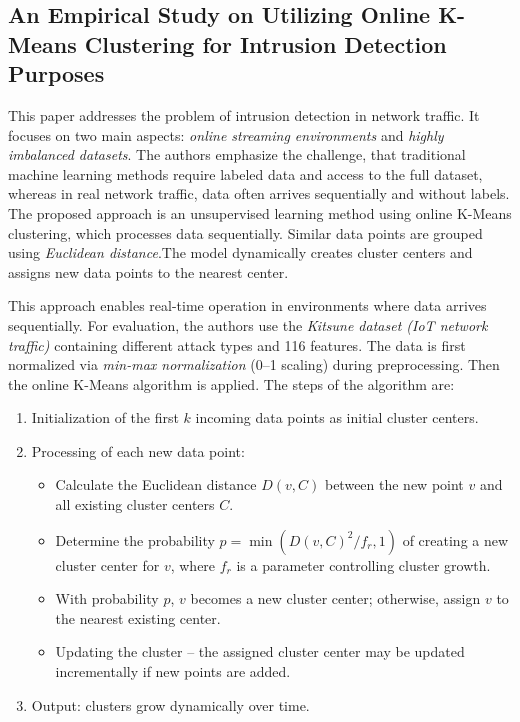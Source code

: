 \subsection{An Empirical Study on Utilizing Online K-Means Clustering for Intrusion Detection Purposes}
This paper \cite{younisse2023empirical} addresses the problem of intrusion detection in network traffic. It focuses on two main aspects: \emph{online streaming environments} and \emph{highly imbalanced datasets}.
The authors emphasize the challenge, that traditional machine learning methods require labeled data and access to the full dataset, whereas in real network traffic, data often arrives sequentially and without labels.
The proposed approach is an unsupervised learning method using online K-Means clustering, which processes data sequentially.
Similar data points are grouped using \emph{Euclidean distance}.The model dynamically creates cluster centers and assigns new data points to the nearest center.

\nextparagraph
This approach enables real-time operation in environments where data arrives sequentially. For evaluation, the authors use the \emph{Kitsune dataset (IoT network traffic)} containing different attack types and 116 features. The data is first normalized via \emph{min-max normalization} (0–1 scaling) during preprocessing. Then the online K-Means algorithm is applied. The steps of the algorithm are:

\begin{enumerate}
    \item Initialization of the first $k$ incoming data points as initial cluster centers.
    \item Processing of each new data point:
    \begin{itemize}
        \item Calculate the Euclidean distance $D(v,C)$ between the new point $v$ and all existing cluster centers $C$.
        \item Determine the probability $p = \min(D(v,C)^2 / f_r, 1)$ of creating a new cluster center for $v$, where $f_r$ is a parameter controlling cluster growth.
        \item With probability $p$, $v$ becomes a new cluster center; otherwise, assign $v$ to the nearest existing center.
        \item Updating the cluster – the assigned cluster center may be updated incrementally if new points are added.
    \end{itemize}
    \item Output: clusters grow dynamically over time.
\end{enumerate}

